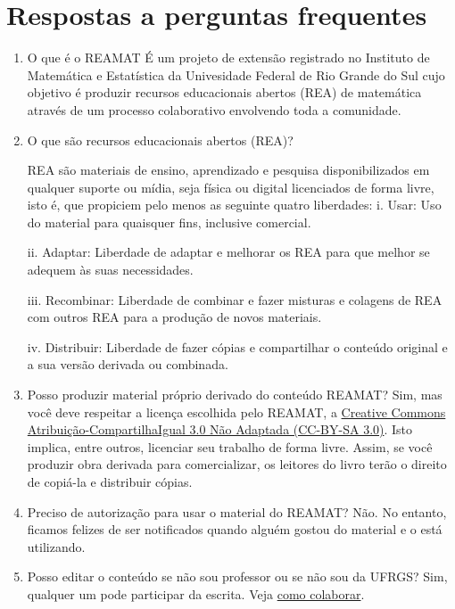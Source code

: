 \documentclass[12pt]{report}
\begin{document}
\chapter*{Respostas a perguntas frequentes}
\begin{enumerate}
\item  O que é o REAMAT
É um projeto de extensão registrado no Instituto de Matemática e Estatística da Univesidade Federal de Rio Grande do Sul cujo objetivo é produzir recursos educacionais abertos (REA) de matemática através de um processo colaborativo envolvendo toda a comunidade.

\item O que são recursos educacionais abertos (REA)?

REA são materiais de ensino, aprendizado e pesquisa disponibilizados em qualquer suporte ou mídia, seja física ou digital licenciados de forma livre, isto é, que propiciem pelo menos as seguinte quatro liberdades:
\subitem i. Usar: Uso do material para quaisquer fins, inclusive comercial.

\subitem ii. Adaptar: Liberdade de adaptar e melhorar os REA para que melhor se adequem às suas necessidades.

\subitem iii. Recombinar: Liberdade de combinar e fazer misturas e colagens de REA com outros REA para a produção de novos materiais.

\subitem iv. Distribuir: Liberdade de fazer cópias e compartilhar o conteúdo original e a sua versão derivada ou combinada.

\item Posso produzir material próprio derivado do conteúdo REAMAT?
Sim, mas você deve respeitar a licença escolhida pelo REAMAT, a \href{https://creativecommons.org/licenses/by-sa/3.0/}{Creative Commons Atribuição-CompartilhaIgual 3.0 Não Adaptada (CC-BY-SA 3.0)}. Isto implica, entre outros, licenciar seu trabalho de forma livre. Assim, se você produzir obra derivada para comercializar, os leitores do livro terão o direito de copiá-la e distribuir cópias.

\item Preciso de autorização para usar o material do REAMAT?
Não. No entanto, ficamos felizes de ser notificados quando alguém gostou do material e o está utilizando.

\item Posso editar o conteúdo se não sou professor ou se não sou da UFRGS?
Sim, qualquer um pode participar da escrita. Veja \href{https://www.ufrgs.br/reamat/participe.html}{como colaborar}.


\end{enumerate}
\end{document}
